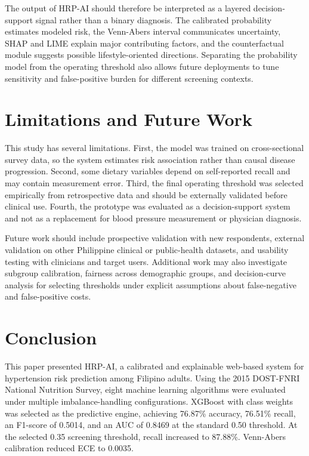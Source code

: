 \documentclass[journal]{IEEEtran}
\begin{document}
The output of HRP-AI should therefore be interpreted as a layered decision-support signal rather than a binary diagnosis. The calibrated probability estimates modeled risk, the Venn-Abers interval communicates uncertainty, SHAP and LIME explain major contributing factors, and the counterfactual module suggests possible lifestyle-oriented directions. Separating the probability model from the operating threshold also allows future deployments to tune sensitivity and false-positive burden for different screening contexts.

\section{Limitations and Future Work}
This study has several limitations. First, the model was trained on cross-sectional survey data, so the system estimates risk association rather than causal disease progression. Second, some dietary variables depend on self-reported recall and may contain measurement error. Third, the final operating threshold was selected empirically from retrospective data and should be externally validated before clinical use. Fourth, the prototype was evaluated as a decision-support system and not as a replacement for blood pressure measurement or physician diagnosis.

Future work should include prospective validation with new respondents, external validation on other Philippine clinical or public-health datasets, and usability testing with clinicians and target users. Additional work may also investigate subgroup calibration, fairness across demographic groups, and decision-curve analysis for selecting thresholds under explicit assumptions about false-negative and false-positive costs.

\section{Conclusion}
This paper presented HRP-AI, a calibrated and explainable web-based system for hypertension risk prediction among Filipino adults. Using the 2015 DOST-FNRI National Nutrition Survey, eight machine learning algorithms were evaluated under multiple imbalance-handling configurations. XGBoost with class weights was selected as the predictive engine, achieving 76.87\% accuracy, 76.51\% recall, an F1-score of 0.5014, and an AUC of 0.8469 at the standard 0.50 threshold. At the selected 0.35 screening threshold, recall increased to 87.88\%. Venn-Abers calibration reduced ECE to 0.0035.
\end{document}
